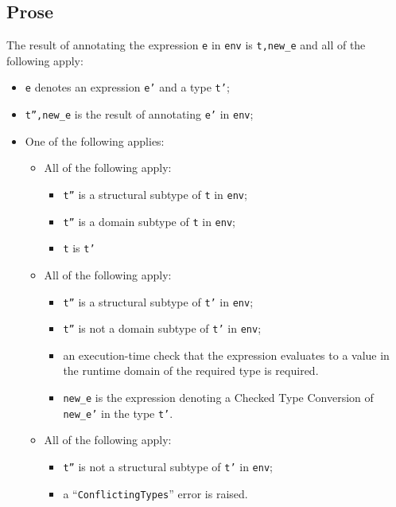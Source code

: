 \documentclass{book}
\begin{document}
\begin{itemize}
  \subsection{Prose}
  The result of annotating the expression \texttt{e} in \texttt{env} is
\texttt{t,new\_e} and all of the following apply:
  \begin{itemize}
  \item \texttt{e} denotes an expression \texttt{e'} and a type \texttt{t'};
  \item \texttt{t'',new\_e} is the result of annotating \texttt{e'} in \texttt{env};
  \item One of the following applies:
    \begin{itemize}
    \item All of the following apply:
      \begin{itemize}
      \item \texttt{t''} is a structural subtype of \texttt{t} in \texttt{env};
      \item \texttt{t''} is a domain subtype of \texttt{t} in \texttt{env};
      \item \texttt{t} is \texttt{t'}
      \end{itemize}
    \item All of the following apply:
      \begin{itemize}
      \item \texttt{t''} is a structural subtype of \texttt{t'} in \texttt{env};
      \item \texttt{t''} is not a domain subtype of \texttt{t'} in \texttt{env};
      \item an execution-time check that the expression evaluates to a value in the
        runtime domain of the required type is required.
      \item \texttt{new\_e} is the expression denoting a Checked Type
        Conversion of \texttt{new\_e'} in the type \texttt{t'}.
     \end{itemize}
   \item All of the following apply:
     \begin{itemize}
     \item \texttt{t''} is not a structural subtype of \texttt{t'} in \texttt{env};
     \item a ``\texttt{ConflictingTypes}'' error is raised.
     \end{itemize}
   \end{itemize}
  \end{itemize}


\end{itemize}
\end{document}
